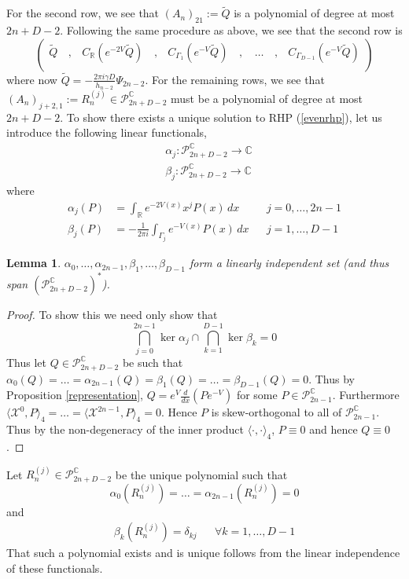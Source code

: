 \documentclass[12pt]{article}
\newtheorem{lemma}[theorem]{Lemma}
\theoremstyle{definition}
\begin{document}
For the second row, we see that $(A_{n})_{21} := \tilde{Q}$ is a polynomial of degree at most $2n+D-2$. Following the same procedure as above, we see that the second row is
$$\left(\begin{array}{ccccccccccccc} \tilde{Q} & \,  , \,&  C_{\mathbb{R}}(e^{-2V}  \tilde{Q}) & \, , \,& C_{\Gamma_1}(e^{-V}  \tilde{Q}) & \, , \,& \, \dots & \,  , \,& C_{\Gamma_{D-1}}(e^{-V}  \tilde{Q}) \\
\end{array}\right)
 $$
where now $\tilde{Q} = - \frac{2\pi i \gamma D}{h_{n-2}}  \Psi_{2n-2}$. For the remaining rows, we see that $(A_n)_{j+2,1} := R^{(j)}_n \in \mathscr{P}^{\mathbb{C}}_{2n+D-2}$ must be a polynomial of degree at most $2n+D-2$. To show there exists a unique solution to RHP (\ref{evenrhp}), let us introduce the following linear functionals, 
\begin{align*}
&\alpha_j :  \mathscr{P}^{\mathbb{C}}_{2n+D-2} \to \mathbb{C} \\
&\beta_j :  \mathscr{P}^{\mathbb{C}}_{2n+D-2} \to \mathbb{C}
\end{align*}
where
\begin{align}
\alpha_j(P) &= \int_\mathbb{R} e^{-2V(x)} x^j P(x) \, dx &  & j = 0, \dots, 2n-1 \label{alpha} \\
\beta_j(P) &= -\frac{1}{2\pi i} \int_{\Gamma_j} e^{-V(x)} P(x) \, dx &  & j = 1, \dots, D-1 \label{beta}
\end{align}
\begin{lemma}\label{linindep}$\alpha_0, \dots, \alpha_{2n-1}, \beta_1, \dots, \beta_{D-1}$ form a linearly independent set (and thus span $(\mathscr{P}_{2n+D-2}^{\mathbb{C}})^\ast$). 
\end{lemma}
\begin{proof}
To show this we need only show that
$$\bigcap_{j=0}^{2n-1} \ker \alpha_j \cap  \bigcap_{k=1}^{D-1} \ker \beta_k = 0$$
Thus let $Q \in \mathscr{P}^\mathbb{C}_{2n+D-2}$ be such that $\alpha_0(Q) = \dots = \alpha_{2n-1}(Q)= \beta_1(Q) = \dots = \beta_{D-1}(Q)=0$.  Thus by Proposition \ref{representation}, $Q = e^V \frac{d}{dx}\left( P e^{-V}\right)$ for some $P \in \mathscr{P}^\mathbb{C}_{2n-1}$. Furthermore $\langle \mathscr{X}^0, P \rangle_4 = \dots = \langle \mathscr{X}^{2n-1}, P \rangle_4 = 0$. Hence $P$ is skew-orthogonal to all of $\mathscr{P}^\mathbb{C}_{2n-1}$. Thus by the non-degeneracy of the inner product $\langle \cdot,\cdot \rangle_4$, $P \equiv 0$ and hence $Q \equiv 0$.
\end{proof}
Let $R^{(j)}_n \in \mathscr{P}^\mathbb{C}_{2n+D-2}$ be the unique polynomial such that $$\alpha_0(R^{(j)}_n) = \dots = \alpha_{2n-1}(R^{(j)}_n) = 0$$
and
\begin{align*}
\beta_k(R^{(j)}_n) = \delta_{kj} & & \forall  k = 1, \dots, D-1
\end{align*}
That such a polynomial exists and is unique follows from the linear independence of these functionals.
\end{document}
